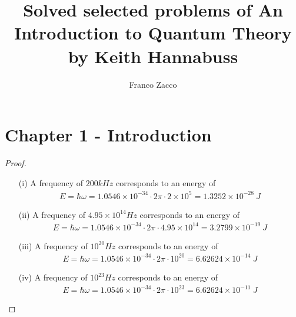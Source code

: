 \documentclass[11pt]{article}
\title{\textbf{Solved selected problems of An Introduction to Quantum Theory
by Keith Hannabuss}}
\author{Franco Zacco}
\date{}
\theoremstyle{definition}
\begin{document}
\maketitle
\thispagestyle{empty}

\section*{Chapter 1 - Introduction}
\begin{proof}{1.1}
\begin{itemize}
\item [(i)] A frequency of $200 kHz$ corresponds to an energy of
\begin{align*}
    E = \hbar \omega = 1.0546 \times 10^{-34} \cdot 2\pi \cdot 2 \times 10^5
    = 1.3252 \times 10^{-28}~J
\end{align*}
\item [(ii)] A frequency of $4.95 \times 10^{14} Hz$ corresponds to an energy
of
\begin{align*}
    E = \hbar \omega = 1.0546 \times 10^{-34} \cdot 2\pi \cdot 4.95 \times 10^{14}
    = 3.2799 \times 10^{-19}~J
\end{align*}
\item [(iii)] A frequency of $10^{20} Hz$ corresponds to an energy of
\begin{align*}
    E = \hbar \omega = 1.0546 \times 10^{-34} \cdot 2\pi \cdot 10^{20}
    = 6.62624\times 10^{-14}~J
\end{align*}
\item [(iv)] A frequency of $10^{23} Hz$ corresponds to an energy of
\begin{align*}
    E = \hbar \omega = 1.0546 \times 10^{-34} \cdot 2\pi \cdot 10^{23}
    = 6.62624\times 10^{-11}~J
\end{align*}
\end{itemize}
\end{proof}
\end{document}
